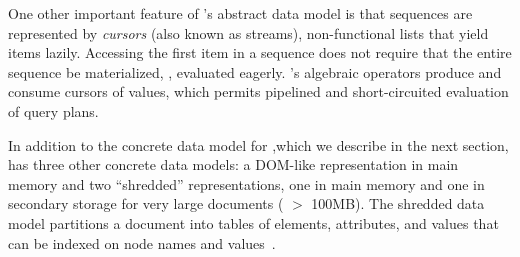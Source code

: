 One other important feature of \Galax{}'s abstract data model is that
sequences are represented by \emph{cursors} (also known as streams),
non-functional lists that yield items lazily.  Accessing the first
item in a sequence does not require that the entire sequence be
materialized, \ie{}, evaluated eagerly.  \Galax{}'s algebraic
operators produce and consume cursors of values, which permits
pipelined and short-circuited evaluation of query plans.

In addition to the concrete data model for \padx{},which we describe in the next
section, \Galax{} has three other 
concrete data models: a DOM-like representation in main memory and two
``shredded'' representations, one in main memory and one in secondary
storage for very large documents (\eg{} $>$ 100MB).  The shredded data
model partitions a document into tables of elements, attributes, and
values that can be indexed on node names and
values~\cite{galax:ximep2004}.


